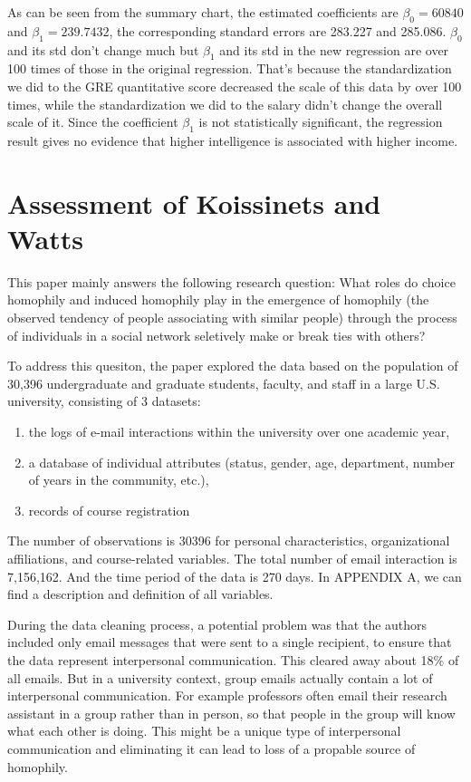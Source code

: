 \documentclass[11pt]{article}
\begin{document}
    As can be seen from the summary chart, the estimated coefficients are
\(\beta_0=60840\) and \(\beta_1=239.7432\), the corresponding standard
errors are 283.227 and 285.086. \(\beta_0\) and its std don't change
much but \(\beta_1\) and its std in the new regression are over 100
times of those in the original regression. That's because the
standardization we did to the GRE quantitative score decreased the scale
of this data by over 100 times, while the standardization we did to the
salary didn't change the overall scale of it. Since the coefficient
\(\beta_1\) is not statistically significant, the regression result
gives no evidence that higher intelligence is associated with higher
income.

    \section{Assessment of Koissinets and
Watts}\label{assessment-of-koissinets-and-watts}

    This paper mainly answers the following research question: What roles do
choice homophily and induced homophily play in the emergence of
homophily (the observed tendency of people associating with similar
people) through the process of individuals in a social network
seletively make or break ties with others?

To address this quesiton, the paper explored the data based on the
population of 30,396 undergraduate and graduate students, faculty, and
staff in a large U.S. university, consisting of 3 datasets:

\begin{enumerate}
\def\labelenumi{\arabic{enumi}.}
\item
  the logs of e-mail interactions within the university over one
  academic year,
\item
  a database of individual attributes (status, gender, age, department,
  number of years in the community, etc.),
\item
  records of course registration
\end{enumerate}

The number of observations is 30396 for personal characteristics,
organizational affiliations, and course-related variables. The total
number of email interaction is 7,156,162. And the time period of the
data is 270 days. In APPENDIX A, we can find a description and
definition of all variables.

During the data cleaning process, a potential problem was that the
authors included only email messages that were sent to a single
recipient, to ensure that the data represent interpersonal
communication. This cleared away about 18\% of all emails. But in a
university context, group emails actually contain a lot of interpersonal
communication. For example professors often email their research
assistant in a group rather than in person, so that people in the group
will know what each other is doing. This might be a unique type of
interpersonal communication and eliminating it can lead to loss of a
propable source of homophily.
\end{document}
